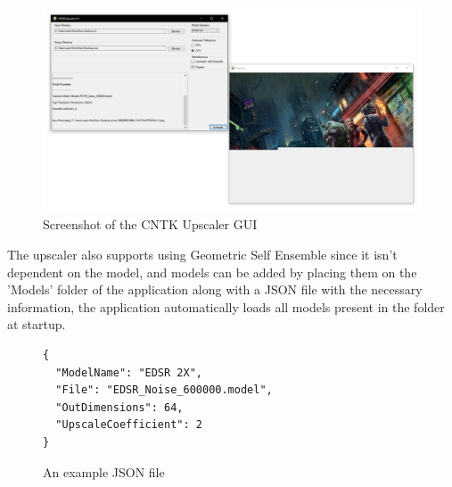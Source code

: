 \hfill

\begin{figure}[H]
\centering
\includegraphics[width=\textwidth]{../Figures/CNTKUpscaler_screenshot}
\caption{Screenshot of the CNTK Upscaler GUI}
\end{figure}

\hfill

The upscaler also supports using Geometric Self Ensemble since it isn't dependent on the model, and models can be added by placing them on the 'Models' folder of the application along with a JSON file with the necessary information, the application automatically loads all models present in the folder at startup.

\hfill

\begin{figure}[H]
\centering
\begin{verbatim}
{
  "ModelName": "EDSR 2X",
  "File": "EDSR_Noise_600000.model",
  "OutDimensions": 64,
  "UpscaleCoefficient": 2
}
\end{verbatim}
\caption{An example JSON file}
\end{figure}